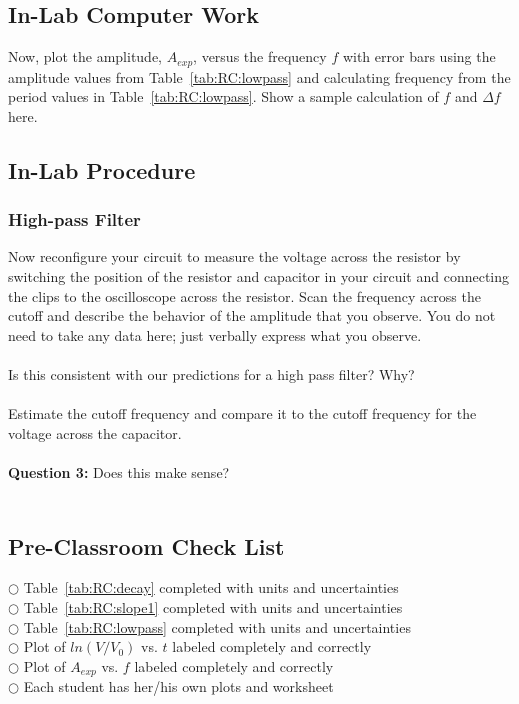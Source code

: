 \subsection{In-Lab Computer Work}
Now, plot the amplitude, $A_{exp}$, versus the frequency $f$ 
with error bars using the amplitude values from Table~\ref{tab:RC:lowpass} and calculating frequency from
the period values in Table~\ref{tab:RC:lowpass}.  Show a sample
calculation of $f$ and $\Delta f$ here. \\

\subsection{In-Lab Procedure}
\subsubsection{High-pass Filter}
Now reconfigure your circuit to measure the voltage across the resistor
by switching the position of the resistor and capacitor in your
circuit and connecting the clips to the oscilloscope across the resistor. Scan
the frequency across the cutoff and describe the behavior of the amplitude 
that you observe. You do not need to take any data here; just verbally express
what you observe.  \\
\ \\
 Is this consistent with our predictions for a high 
pass filter? Why? \\
\vspace*{1.5cm} \\
  Estimate the cutoff
frequency and compare it to the cutoff frequency for the voltage across the 
capacitor. \\
\vspace*{2.2cm} \\
{\bf Question 3:} Does this make sense?  \\
\ \\


\subsection{Pre-Classroom Check List}
\noindent $\bigcirc$ \hspace*{1cm} Table~\ref{tab:RC:decay} completed with units and uncertainties \\
$\bigcirc$ \hspace*{1cm} Table~\ref{tab:RC:slope1} completed with units and uncertainties \\
$\bigcirc$ \hspace*{1cm} Table~\ref{tab:RC:lowpass} completed with units and uncertainties \\
$\bigcirc$ \hspace*{1cm} Plot of $ln(V/V_0)$  vs. $t$ labeled completely and correctly \\
$\bigcirc$ \hspace*{1cm} Plot of $A_{exp}$ vs. $f$ labeled completely and correctly \\
$\bigcirc$ \hspace*{1cm} Each student has her/his own plots and worksheet \\
 

